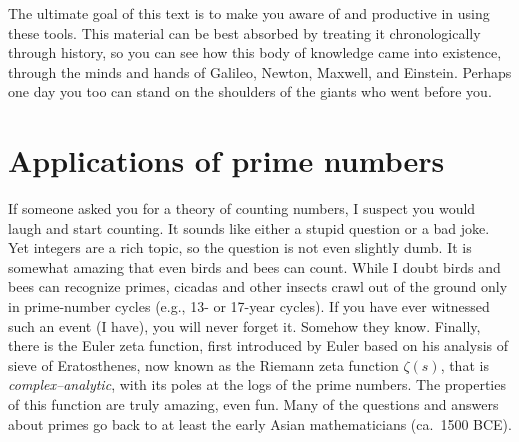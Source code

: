 \documentclass{ximera}
\begin{document}
The ultimate goal of this text is to make you aware of and productive in using these tools.
This material can be best absorbed by treating it chronologically through history, so you
can see how this body of knowledge came into existence, through the minds and hands of Galileo,
Newton, Maxwell, and Einstein. Perhaps one day you too can stand on the shoulders of the giants who
went before you.

\section {Applications of prime numbers \label{Lec 4}}

If someone asked you for a theory of counting numbers, I suspect you would laugh and start counting.
It sounds like either a stupid question or a bad joke.  Yet integers are a rich topic, so the question
is not even slightly dumb.
It is somewhat amazing that even birds and bees can count.  While I doubt birds and bees can recognize
primes, cicadas and other insects crawl out of the ground only in prime-number cycles (e.g., 13- or
17-year cycles). If you have ever witnessed such an event (I have), you will never forget it. 
Somehow they know.  Finally, there is the Euler zeta function, first introduced by Euler based on his
analysis of sieve of Eratosthenes, now known as the Riemann zeta function $\zeta(s)$, that is
\emph{complex--analytic}, with its poles at the logs of the prime numbers. 
The properties of this function are truly amazing, even fun.
Many of the questions and answers about primes go back to at least the early Asian
mathematicians (ca.~1500 BCE).

  
  
\end{document}
